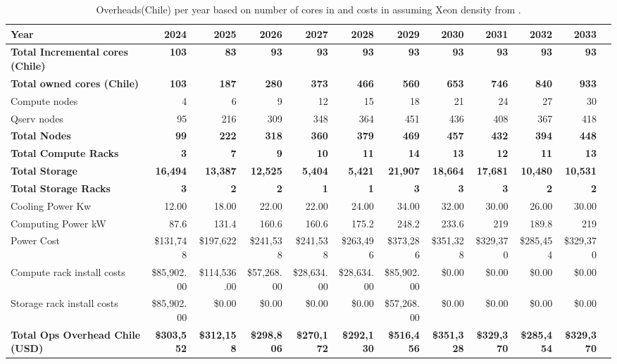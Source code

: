 \tiny \begin{longtable} { |p{}  |r  |r  |r  |r  |r  |r  |r  |r  |r  |r  |r |} 
\caption{Overheads(Chile) per year based on number of cores in  and costs in  assuming Xeon density from .  \label{tab:opsOverheadChile}}\\ 
\hline 
\textbf{Year}&\textbf{2024}&\textbf{2025}&\textbf{2026}&\textbf{2027}&\textbf{2028}&\textbf{2029}&\textbf{2030}&\textbf{2031}&\textbf{2032}&\textbf{2033} \\ \hline
\textbf{Total Incremental cores (Chile)}&\textbf{103}&\textbf{83}&\textbf{93}&\textbf{93}&\textbf{93}&\textbf{93}&\textbf{93}&\textbf{93}&\textbf{93}&\textbf{93} \\ \hline
\textbf{Total owned cores (Chile)}&\textbf{103}&\textbf{187}&\textbf{280}&\textbf{373}&\textbf{466}&\textbf{560}&\textbf{653}&\textbf{746}&\textbf{840}&\textbf{933} \\ \hline
{Compute nodes}&{4}&{6}&{9}&{12}&{15}&{18}&{21}&{24}&{27}&{30} \\ \hline
{Qserv nodes}&{95}&{216}&{309}&{348}&{364}&{451}&{436}&{408}&{367}&{418} \\ \hline
\textbf{Total Nodes}&\textbf{99}&\textbf{222}&\textbf{318}&\textbf{360}&\textbf{379}&\textbf{469}&\textbf{457}&\textbf{432}&\textbf{394}&\textbf{448} \\ \hline
\textbf{Total Compute Racks}&\textbf{3}&\textbf{7}&\textbf{9}&\textbf{10}&\textbf{11}&\textbf{14}&\textbf{13}&\textbf{12}&\textbf{11}&\textbf{13} \\ \hline
\textbf{Total Storage}&\textbf{16,494}&\textbf{13,387}&\textbf{12,525}&\textbf{5,404}&\textbf{5,421}&\textbf{21,907}&\textbf{18,664}&\textbf{17,681}&\textbf{10,480}&\textbf{10,531} \\ \hline
\textbf{Total Storage Racks}&\textbf{3}&\textbf{2}&\textbf{2}&\textbf{1}&\textbf{1}&\textbf{3}&\textbf{3}&\textbf{3}&\textbf{2}&\textbf{2} \\ \hline
{Cooling Power Kw}&{12.00}&{18.00}&{22.00}&{22.00}&{24.00}&{34.00}&{32.00}&{30.00}&{26.00}&{30.00} \\ \hline
{Computing Power kW
}&{87.6}&{131.4}&{160.6}&{160.6}&{175.2}&{248.2}&{233.6}&{219}&{189.8}&{219} \\ \hline
{Power Cost}&{\$131,748}&{\$197,622}&{\$241,538}&{\$241,538}&{\$263,496}&{\$373,286}&{\$351,328}&{\$329,370}&{\$285,454}&{\$329,370} \\ \hline
{Compute rack install costs}&{\$85,902.00}&{\$114,536.00}&{\$57,268.00}&{\$28,634.00}&{\$28,634.00}&{\$85,902.00}&{\$0.00}&{\$0.00}&{\$0.00}&{\$0.00} \\ \hline
{Storage rack install costs}&{\$85,902.00}&{\$0.00}&{\$0.00}&{\$0.00}&{\$0.00}&{\$57,268.00}&{\$0.00}&{\$0.00}&{\$0.00}&{\$0.00} \\ \hline
\textbf{Total Ops Overhead Chile (USD)}&\textbf{\$303,552}&\textbf{\$312,158}&\textbf{\$298,806}&\textbf{\$270,172}&\textbf{\$292,130}&\textbf{\$516,456}&\textbf{\$351,328}&\textbf{\$329,370}&\textbf{\$285,454}&\textbf{\$329,370} \\ \hline
\end{longtable} \normalsize
